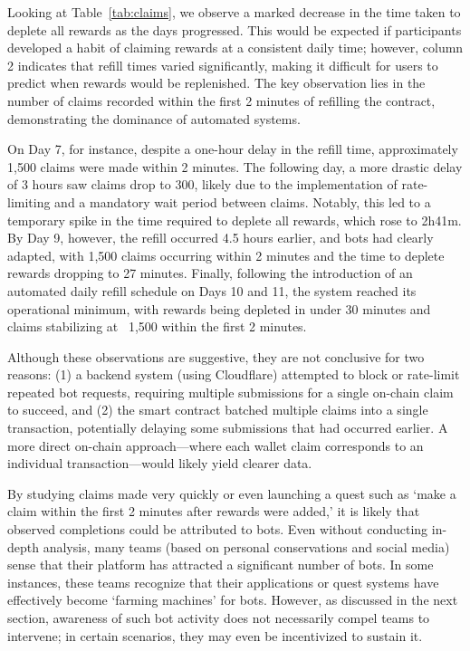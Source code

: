 

Looking at Table~\ref{tab:claims}, we observe a marked decrease in the time taken to deplete all rewards as the days progressed. This would be expected if participants developed a habit of claiming rewards at a consistent daily time; however, column 2 indicates that refill times varied significantly, making it difficult for users to predict when rewards would be replenished. The key observation lies in the number of claims recorded within the first 2 minutes of refilling the contract, demonstrating the dominance of automated systems.

On Day 7, for instance, despite a one-hour delay in the refill time, approximately 1,500 claims were made within 2 minutes. The following day, a more drastic delay of 3 hours saw claims drop to 300, likely due to the implementation of rate-limiting and a mandatory wait period between claims. Notably, this led to a temporary spike in the time required to deplete all rewards, which rose to 2h41m. By Day 9, however, the refill occurred 4.5 hours earlier, and bots had clearly adapted, with 1,500 claims occurring within 2 minutes and the time to deplete rewards dropping to 27 minutes. Finally, following the introduction of an automated daily refill schedule on Days 10 and 11, the system reached its operational minimum, with rewards being depleted in under 30 minutes and claims stabilizing at ~1,500 within the first 2 minutes.

Although these observations are suggestive, they are not conclusive for two reasons: (1) a backend system (using Cloudflare) attempted to block or rate-limit repeated bot requests, requiring multiple submissions for a single on-chain claim to succeed, and (2) the smart contract batched multiple claims into a single transaction, potentially delaying some submissions that had occurred earlier. A more direct on-chain approach—where each wallet claim corresponds to an individual transaction—would likely yield clearer data.

By studying claims made very quickly or even launching a quest such as `make a claim within the first 2 minutes after rewards were added,' it is likely that observed completions could be attributed to bots. Even without conducting in-depth analysis, many teams (based on personal conservations and social media) sense that their platform has attracted a significant number of bots. In some instances, these teams recognize that their applications or quest systems have effectively become `farming machines' for bots. However, as discussed in the next section, awareness of such bot activity does not necessarily compel teams to intervene; in certain scenarios, they may even be incentivized to sustain it.

